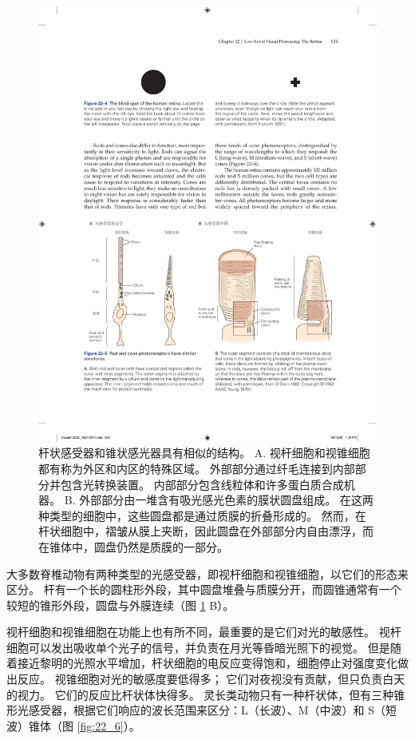 \begin{figure}[htbp]
	\centering
	\includegraphics[width=1.0\linewidth]{chap22/fig_22_5}
	\caption{杆状感受器和锥状感光器具有相似的结构。
		A. 视杆细胞和视锥细胞都有称为外区和内区的特殊区域。
		外部部分通过纤毛连接到内部部分并包含光转换装置。
		内部部分包含线粒体和许多蛋白质合成机器。
		B. 外部部分由一堆含有吸光感光色素的膜状圆盘组成。
		在这两种类型的细胞中，这些圆盘都是通过质膜的折叠形成的。
		然而，在杆状细胞中，褶皱从膜上夹断，因此圆盘在外部部分内自由漂浮，而在锥体中，圆盘仍然是质膜的一部分\cite{o1982chemistry,young1970visual}。}
	\label{fig:22_5}
\end{figure}


大多数脊椎动物有两种类型的光感受器，即视杆细胞和视锥细胞，以它们的形态来区分。
杆有一个长的圆柱形外段，其中圆盘堆叠与质膜分开，而圆锥通常有一个较短的锥形外段，圆盘与外膜连续（图 \ref{fig:22_5} B）。


视杆细胞和视锥细胞在功能上也有所不同，最重要的是它们对光的敏感性。
视杆细胞可以发出吸收单个光子的信号，并负责在月光等昏暗光照下的视觉。
但是随着接近黎明的光照水平增加，杆状细胞的电反应变得饱和，细胞停止对强度变化做出反应。 
视锥细胞对光的敏感度要低得多； 它们对夜视没有贡献，但只负责白天的视力。
它们的反应比杆状体快得多。
灵长类动物只有一种杆状体，但有三种锥形光感受器，根据它们响应的波长范围来区分：L（长波）、M（中波）和 S（短波）锥体（图 \ref{fig:22_6}）。


